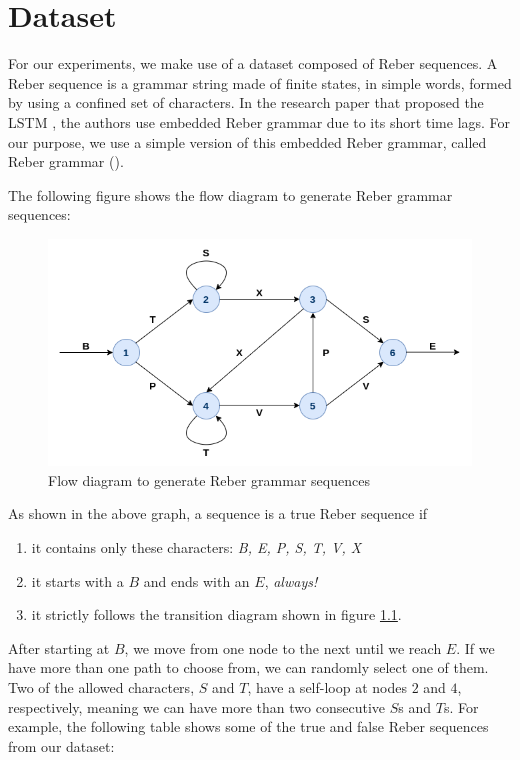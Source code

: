 \chapter{Dataset}\label{chap:dataset}

For our experiments, we make use of a dataset composed of Reber sequences. A Reber sequence is a grammar string made of finite states, in simple words, formed by using a confined set of characters. In the research paper that proposed the LSTM \cite{lstm}, the authors use embedded Reber grammar due to its short time lags. For our purpose, we use a simple version of this embedded Reber grammar, called Reber grammar (\cite{reber}).

The following figure shows the flow diagram to generate Reber grammar sequences:

\begin{figure}[h]
    \centering
    \includegraphics[width=0.9\linewidth]{images/dataset/reber.png}
    \caption[Flow diagram to generate Reber grammar sequences]{Flow diagram to generate Reber grammar sequences}
    \label{fig:reber}
\end{figure}

As shown in the above graph, a sequence is a true Reber sequence if
\begin{enumerate}
    \item it contains only these characters: \textit{B, E, P, S, T, V, X}
    \item it starts with a $B$ and ends with an $E$, \textit{always!}
    \item it strictly follows the transition diagram shown in figure \ref{fig:reber}.
\end{enumerate}

After starting at $B$, we move from one node to the next until we reach $E$. If we have more than one path to choose from, we can randomly select one of them. Two of the allowed characters, $S$ and $T$, have a self-loop at nodes $2$ and $4$, respectively, meaning we can have more than two consecutive $S$s and $T$s. For example, the following table shows some of the true and false Reber sequences from our dataset:

